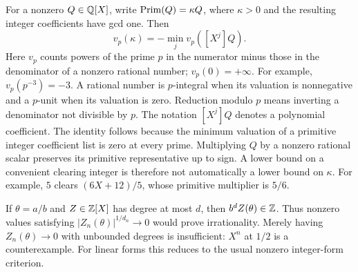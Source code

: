For a nonzero $Q\in\mathbb Q[X]$, write $\operatorname{Prim}(Q)=\kappa Q$, where
$\kappa>0$ and the resulting integer coefficients have gcd one. Then
\begin{equation}\label{eq:primitive}
 v_p(\kappa)=-\min_j v_p([X^j]Q).
\end{equation}
Here $v_p$ counts powers of the prime $p$ in the numerator minus those
in the denominator of a nonzero rational number; $v_p(0)=+\infty$.
For example, $v_p(p^{-3})=-3$. A rational number is $p$-integral
when its valuation is nonnegative and a $p$-unit when its valuation is zero.
Reduction modulo $p$ means inverting a denominator not divisible by $p$.
The notation $[X^j]Q$ denotes a polynomial coefficient.
The identity follows because the minimum valuation of a primitive
integer coefficient list is zero at every prime. Multiplying $Q$ by a
nonzero rational scalar preserves its primitive representative up to
sign. A lower bound on a convenient clearing integer is therefore not
automatically a lower bound on $\kappa$. For example, $5$ clears
$(6X+12)/5$, whose primitive multiplier is $5/6$.

If $\theta=a/b$ and $Z\in\mathbb Z[X]$ has degree at most $d$, then
$b^d Z(\theta)\in\mathbb Z$. Thus nonzero values satisfying
$|Z_n(\theta)|^{1/d_n}\to0$ would prove irrationality. Merely having
$Z_n(\theta)\to0$ with unbounded degrees is insufficient: $X^n$ at
$1/2$ is a counterexample. For linear forms this reduces to the usual
nonzero integer-form criterion.

